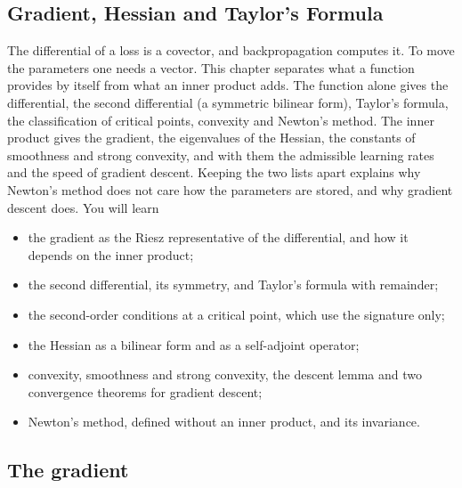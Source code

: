 \begin{notechapter}
\chapter{Gradient, Hessian and Taylor's Formula}
\label{ch:gradient-hessian}

\begin{chapterintro}
The differential of a loss is a covector, and backpropagation computes it.
To move the parameters one needs a vector. This chapter separates what a
function provides by itself from what an inner product adds. The function
alone gives the differential, the second differential (a symmetric
bilinear form), Taylor's formula, the classification of critical points,
convexity and Newton's method. The inner product gives the gradient, the
eigenvalues of the Hessian, the constants of smoothness and strong
convexity, and with them the admissible learning rates and the speed of
gradient descent. Keeping the two lists apart explains why Newton's method
does not care how the parameters are stored, and why gradient descent
does. You will learn
\begin{itemize}[nosep]
  \item the gradient as the Riesz representative of the differential, and
        how it depends on the inner product;
  \item the second differential, its symmetry, and Taylor's formula with
        remainder;
  \item the second-order conditions at a critical point, which use the
        signature only;
  \item the Hessian as a bilinear form and as a self-adjoint operator;
  \item convexity, smoothness and strong convexity, the descent lemma and
        two convergence theorems for gradient descent;
  \item Newton's method, defined without an inner product, and its
        invariance.
\end{itemize}
\end{chapterintro}

\section{The gradient}\label{gradient-hessian:sec:gradient}


\end{notechapter}
